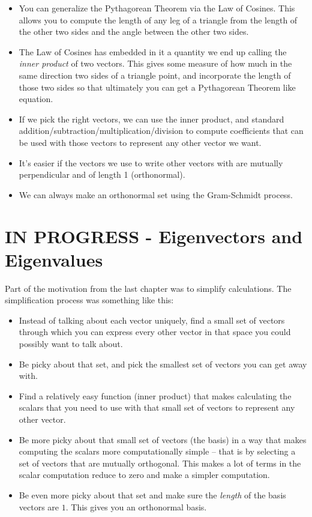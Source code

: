 \documentclass[
]{book}
\providecommand{\tightlist}{%
  \setlength{\itemsep}{0pt}\setlength{\parskip}{0pt}}
\begin{document}
\begin{itemize}
\tightlist
\item
  You can generalize the Pythagorean Theorem via the Law of Cosines. This allows you to compute the length of any leg of a triangle from the length of the other two sides and the angle between the other two sides.
\item
  The Law of Cosines has embedded in it a quantity we end up calling the \emph{inner product} of two vectors. This gives some measure of how much in the same direction two sides of a triangle point, and incorporate the length of those two sides so that ultimately you can get a Pythagorean Theorem like equation.
\item
  If we pick the right vectors, we can use the inner product, and standard addition/subtraction/multiplication/division to compute coefficients that can be used with those vectors to represent any other vector we want.
\item
  It's easier if the vectors we use to write other vectors with are mutually perpendicular and of length 1 (orthonormal).
\item
  We can always make an orthonormal set using the Gram-Schmidt process.
\end{itemize}

\hypertarget{in-progress---eigenvectors-and-eigenvalues}{%
\chapter{IN PROGRESS - Eigenvectors and Eigenvalues}\label{in-progress---eigenvectors-and-eigenvalues}}

Part of the motivation from the last chapter was to simplify calculations. The simplification process was something like this:

\begin{itemize}
\tightlist
\item
  Instead of talking about each vector uniquely, find a small set of vectors through which you can express every other vector in that space you could possibly want to talk about.
\item
  Be picky about that set, and pick the smallest set of vectors you can get away with.
\item
  Find a relatively easy function (inner product) that makes calculating the scalars that you need to use with that small set of vectors to represent any other vector.
\item
  Be more picky about that small set of vectors (the basis) in a way that makes computing the scalars more computationally simple -- that is by selecting a set of vectors that are mutually orthogonal. This makes a lot of terms in the scalar computation reduce to zero and make a simpler computation.
\item
  Be even more picky about that set and make sure the \emph{length} of the basis vectors are \(1\). This gives you an orthonormal basis.
\end{itemize}
\end{document}
